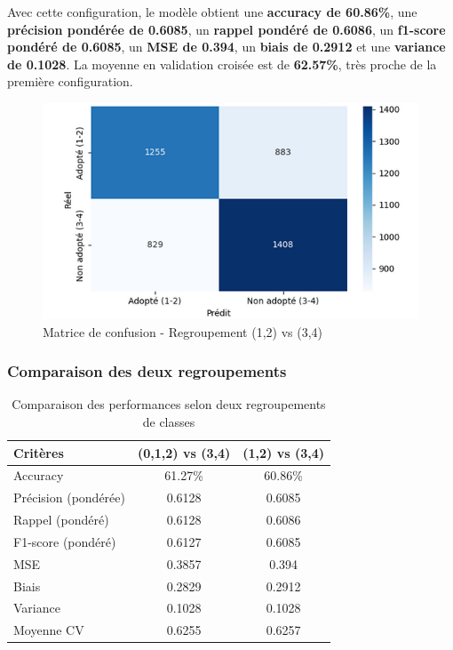 \documentclass[a4paper,12pt]{article}
\begin{document}
Avec cette configuration, le modèle obtient une \textbf{accuracy de 60.86\%}, une \textbf{précision pondérée de 0.6085}, un \textbf{rappel pondéré de 0.6086}, un \textbf{f1-score pondéré de 0.6085}, un \textbf{MSE de 0.394}, un \textbf{biais de 0.2912} et une \textbf{variance de 0.1028}. La moyenne en validation croisée est de \textbf{62.57\%}, très proche de la première configuration.

\begin{figure}[H]
    \centering
    \includegraphics[width=0.7\linewidth]{matrice2.png}
    \caption{Matrice de confusion - Regroupement (1,2) vs (3,4)}
    \label{fig:rf_confusion_groupe12}
\end{figure}

\subsubsection*{Comparaison des deux regroupements}

\begin{table}[H]
    \centering
    \begin{tabular}{|l|c|c|}
        \hline
        \textbf{Critères}    & \textbf{(0,1,2) vs (3,4)} & \textbf{(1,2) vs (3,4)} \\
        \hline
        Accuracy             & 61.27\%                   & 60.86\%                 \\
        Précision (pondérée) & 0.6128                    & 0.6085                  \\
        Rappel (pondéré)     & 0.6128                    & 0.6086                  \\
        F1-score (pondéré)   & 0.6127                    & 0.6085                  \\
        MSE                  & 0.3857                    & 0.394                   \\
        Biais                & 0.2829                    & 0.2912                  \\
        Variance             & 0.1028                    & 0.1028                  \\
        Moyenne CV           & 0.6255                    & 0.6257                  \\
        \hline
    \end{tabular}
    \caption{Comparaison des performances selon deux regroupements de classes}
    \label{tab:rf_comparaison_regroupements}
\end{table}
\end{document}
